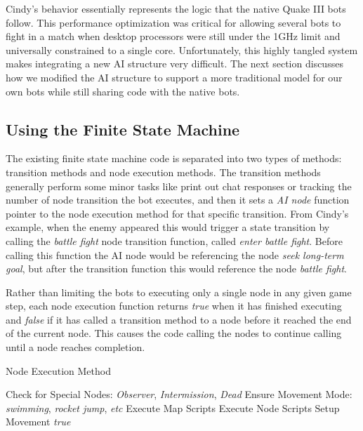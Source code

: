 Cindy's behavior essentially represents the logic that the native Quake III bots follow. This performance optimization was critical for allowing several bots to fight in a match when desktop processors were still under the 1GHz limit and universally constrained to a single core. Unfortunately, this highly tangled system makes integrating a new AI structure very difficult. The next section discusses how we modified the AI structure to support a more traditional model for our own bots while still sharing code with the native bots.

\subsection{Using the Finite State Machine}

The existing finite state machine code is separated into two types of methods: transition methods and node execution methods. The transition methods generally perform some minor tasks like print out chat responses or tracking the number of node transition the bot executes, and then it sets a \emph{AI node} function pointer to the node execution method for that specific transition. From Cindy's example, when the enemy appeared this would trigger a state transition by calling the \emph{battle fight} node transition function, called \emph{enter battle fight}. Before calling this function the AI node would be referencing the node \emph{seek long-term goal}, but after the transition function this would reference the node \emph{battle fight}.

Rather than limiting the bots to executing only a single node in any given game step, each node execution function returns \emph{true} when it has finished executing and \emph{false} if it has called a transition method to a node before it reached the end of the current node. This causes the code calling the nodes to continue calling until a node reaches completion.

\begin{algorithm}
\caption{Node Execution Method}
\label{ainode}
    {\fontsize{12}{10}\selectfont
    \begin{algorithmic}[1]
        \STATE Check for Special Nodes: \emph{Observer}, \emph{Intermission}, \emph{Dead}
        \STATE Ensure Movement Mode: \emph{swimming}, \emph{rocket jump}, \emph{etc}
        \STATE Execute Map Scripts
        \STATE Execute Node Scripts
        \STATE Setup Movement
        \RETURN \emph{true}
    \end{algorithmic}
    }
\end{algorithm}

